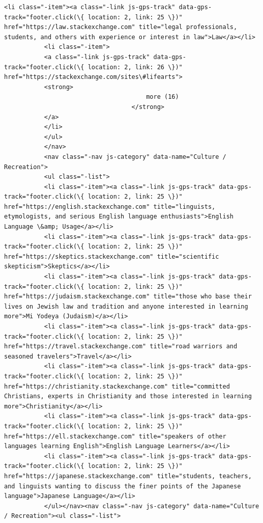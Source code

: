 \documentclass[11pt]{article}
\begin{document}
\begin{Verbatim}[commandchars=\\\{\}]
           <li class="-item"><a class="-link js-gps-track" data-gps-track="footer.click(\{ location: 2, link: 25 \})" href="https://law.stackexchange.com" title="legal professionals, students, and others with experience or interest in law">Law</a></li>
           <li class="-item">
           <a class="-link js-gps-track" data-gps-track="footer.click(\{ location: 2, link: 26 \})" href="https://stackexchange.com/sites\#lifearts">
           <strong>
                                       more (16)
                                   </strong>
           </a>
           </li>
           </ul>
           </nav>
           <nav class="-nav js-category" data-name="Culture / Recreation">
           <ul class="-list">
           <li class="-item"><a class="-link js-gps-track" data-gps-track="footer.click(\{ location: 2, link: 25 \})" href="https://english.stackexchange.com" title="linguists, etymologists, and serious English language enthusiasts">English Language \&amp; Usage</a></li>
           <li class="-item"><a class="-link js-gps-track" data-gps-track="footer.click(\{ location: 2, link: 25 \})" href="https://skeptics.stackexchange.com" title="scientific skepticism">Skeptics</a></li>
           <li class="-item"><a class="-link js-gps-track" data-gps-track="footer.click(\{ location: 2, link: 25 \})" href="https://judaism.stackexchange.com" title="those who base their lives on Jewish law and tradition and anyone interested in learning more">Mi Yodeya (Judaism)</a></li>
           <li class="-item"><a class="-link js-gps-track" data-gps-track="footer.click(\{ location: 2, link: 25 \})" href="https://travel.stackexchange.com" title="road warriors and seasoned travelers">Travel</a></li>
           <li class="-item"><a class="-link js-gps-track" data-gps-track="footer.click(\{ location: 2, link: 25 \})" href="https://christianity.stackexchange.com" title="committed Christians, experts in Christianity and those interested in learning more">Christianity</a></li>
           <li class="-item"><a class="-link js-gps-track" data-gps-track="footer.click(\{ location: 2, link: 25 \})" href="https://ell.stackexchange.com" title="speakers of other languages learning English">English Language Learners</a></li>
           <li class="-item"><a class="-link js-gps-track" data-gps-track="footer.click(\{ location: 2, link: 25 \})" href="https://japanese.stackexchange.com" title="students, teachers, and linguists wanting to discuss the finer points of the Japanese language">Japanese Language</a></li>
           </ul></nav><nav class="-nav js-category" data-name="Culture / Recreation"><ul class="-list">

\end{Verbatim}
\end{document}
